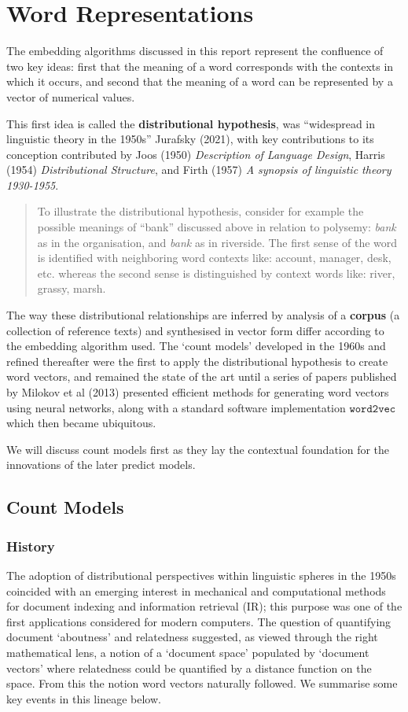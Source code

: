\chapter{Word Representations}
The embedding algorithms discussed in this report represent the confluence of two key ideas: first that the meaning of a word corresponds with the contexts in which it occurs, and second that the meaning of a word can be represented by a vector of numerical values.

This first idea is called the \textbf{distributional hypothesis}, was ``widespread in linguistic theory in the 1950s'' Jurafsky (2021), with key contributions to its conception contributed by Joos (1950) \emph{Description of Language Design}, Harris (1954) \emph{Distributional Structure}, and Firth (1957) \emph{A synopsis of linguistic theory 1930-1955}.

\begin{quote}
To illustrate the distributional hypothesis, consider for example the possible meanings of ``bank'' discussed above in relation to polysemy: \emph{bank} as in the organisation, and \emph{bank} as in riverside. The first sense of the word is identified with neighboring word contexts like: account, manager, desk, etc. whereas the second sense is distinguished by context words like: river, grassy, marsh.
\end{quote}

The way these distributional relationships are inferred by analysis of a \textbf{corpus} (a collection of reference texts) and synthesised in vector form differ according to the embedding algorithm used. The `count models' developed in the 1960s and refined thereafter were the first to apply the distributional hypothesis to create word vectors, and remained the state of the art until a series of papers published by Milokov et al (2013) presented efficient methods for generating word vectors using neural networks, along with a standard software implementation $\texttt{word2vec}$ which then became ubiquitous.

We will discuss count models first as they lay the contextual foundation for the innovations of the later predict models.

\section{Count Models}
\subsection{History}
The adoption of distributional perspectives within linguistic spheres in the 1950s coincided with an emerging interest in mechanical and computational methods for document indexing and information retrieval (IR); this purpose was one of the first applications considered for modern computers. The question of quantifying document `aboutness' and relatedness suggested, as viewed through the right mathematical lens, a notion of a `document space' populated by `document vectors' where relatedness could be quantified by a distance function on the space. From this the notion word vectors naturally followed. We summarise some key events in this lineage below.

